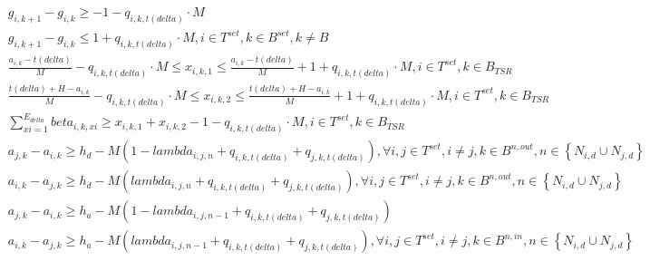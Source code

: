 \begin{align}
  & g_{i , k + 1} - g_{i , k} \geq - 1 - q_{i , k , t \left(\mathit{delta}\right)} \cdot M \tag{eq\_0026\_a} \\
  & g_{i , k + 1} - g_{i , k} \leq 1 + q_{i , k , t \left(\mathit{delta}\right)} \cdot M , i \in T^{\mathit{set}} , k \in B^{\mathit{set}} , k \neq B \tag{eq\_0026\_b} \\
  & \frac{a_{i , k} - t \left(\mathit{delta}\right)}{M} - q_{i , k , t \left(\mathit{delta}\right)} \cdot M \leq x_{i , k , 1} \leq \frac{a_{i , k} - t \left(\mathit{delta}\right)}{M} + 1 + q_{i , k , t \left(\mathit{delta}\right)} \cdot M , i \in T^{\mathit{set}} , k \in B_{\mathit{TSR}} \tag{eq\_0027} \\
  & \frac{t \left(\mathit{delta}\right) + H - a_{i , k}}{M} - q_{i , k , t \left(\mathit{delta}\right)} \cdot M \leq x_{i , k , 2} \leq \frac{t \left(\mathit{delta}\right) + H - a_{i , k}}{M} +\text{1}+ q_{i , k , t \left(\mathit{delta}\right)} \cdot M , i \in T^{\mathit{set}} , k \in B_{\mathit{TSR}} \tag{eq\_0028} \\
  & \sum_{\mathit{xi} = 1}^{E_{\mathit{delta}}} \mathit{beta}_{i , k , \mathit{xi}} \geq x_{i , k , 1} + x_{i , k , 2} - 1 - q_{i , k , t \left(\mathit{delta}\right)} \cdot M , i \in T^{\mathit{set}} , k \in B_{\mathit{TSR}} \tag{eq\_0029} \\
  & a_{j , k} - a_{i , k} \geq h_{d} - M \left(1 - \mathit{lambda}_{i , j , n} + q_{i , k , t \left(\mathit{delta}\right)} + q_{j , k , t \left(\mathit{delta}\right)}\right) , \forall i , j \in T^{\mathit{set}} , i \neq j , k \in B^{n , o u t} , n \in \left\{N_{i , d} \cup N_{j , d}\right\} \tag{eq\_0030\_a} \\
  & a_{i , k} - a_{j , k} \geq h_{d} - M \left(\mathit{lambda}_{i , j , n} + q_{i , k , t \left(\mathit{delta}\right)} + q_{j , k , t \left(\mathit{delta}\right)}\right) , \forall i , j \in T^{\mathit{set}} , i \neq j , k \in B^{n , o u t} , n \in \left\{N_{i , d} \cup N_{j , d}\right\} \tag{eq\_0030\_b} \\
  & a_{j , k} - a_{i , k} \geq h_{a} - M \left(1 - \mathit{lambda}_{i , j , n - 1} + q_{i , k , t \left(\mathit{delta}\right)} + q_{j , k , t \left(\mathit{delta}\right)}\right) \tag{eq\_0031\_a} \\
  & a_{i , k} - a_{j , k} \geq h_{a} - M \left(\mathit{lambda}_{i , j , n - 1} + q_{i , k , t \left(\mathit{delta}\right)} + q_{j , k , t \left(\mathit{delta}\right)}\right) , \forall i , j \in T^{\mathit{set}} , i \neq j , k \in B^{n , i n} , n \in \left\{N_{i , d} \cup N_{j , d}\right\} \tag{eq\_0031\_b} \\

\end{align}
